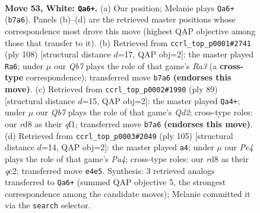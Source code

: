 \documentclass[11pt]{article}
\begin{document}
\clearpage

\begin{figure}[p]\centering
\begin{subfigure}{0.46\textwidth}\centering
\resizebox{\linewidth}{!}{%
\newchessgame
\chessboard[
  setfen={3r4/1Q6/5k2/8/4P3/8/6PP/1K6 w - - 1 53},
  showmover=false,
  pgfstyle=straightmove, color=movearrow, markmove={b7-a6}
]}
\caption{}
\end{subfigure}\hfill
\begin{subfigure}{0.46\textwidth}\centering
\resizebox{\linewidth}{!}{%
\newchessgame
\chessboard[
  setfen={8/6k1/8/6P1/8/R5K1/4P3/7r w - - 1 55},
  showmover=false,
  pgfstyle=straightmove, color=movearrow, markmove={a3-a6}
]}
\caption{}
\end{subfigure}
\\[4pt]
\begin{subfigure}{0.46\textwidth}\centering
\resizebox{\linewidth}{!}{%
\newchessgame
\chessboard[
  setfen={8/3q3k/4p3/4P3/8/P7/2K5/5Q2 b - - 0 45},
  showmover=false,
  pgfstyle=straightmove, color=movearrow, markmove={d7-a4}
]}
\caption{}
\end{subfigure}\hfill
\begin{subfigure}{0.46\textwidth}\centering
\resizebox{\linewidth}{!}{%
\newchessgame
\chessboard[
  setfen={k2q4/5K2/8/p7/8/8/P1Q5/8 b - - 1 53},
  showmover=false,
  pgfstyle=straightmove, color=movearrow, markmove={a5-a4}
]}
\caption{}
\end{subfigure}
\caption{\textbf{Move 53, White: \texttt{Qa6+}.} (a) Our position; Melanie plays \texttt{Qa6+} (\texttt{b7a6}). Panels (b)--(d) are the retrieved master positions whose correspondence most drove this move (highest QAP objective among those that transfer to it). (b) Retrieved from \texttt{ccrl\_top\_p0001\#2741} (ply 108) [structural distance $d$=17, QAP obj=2]: the master played \texttt{Ra6}; under $\mu$ our \emph{Qb7} plays the role of that game's \emph{Ra3} (a \textbf{cross-type} correspondence); transferred move \texttt{b7a6} \textbf{(endorses this move)}. (c) Retrieved from \texttt{ccrl\_top\_p0002\#1990} (ply 89) [structural distance $d$=15, QAP obj=2]: the master played \texttt{Qa4+}; under $\mu$ our \emph{Qb7} plays the role of that game's \emph{Qd2}; cross-type roles: our \emph{r}d8 as their \emph{q}f1; transferred move \texttt{b7a6} \textbf{(endorses this move)}. (d) Retrieved from \texttt{ccrl\_top\_p0003\#2049} (ply 105) [structural distance $d$=14, QAP obj=2]: the master played \texttt{a4}; under $\mu$ our \emph{Pe4} plays the role of that game's \emph{Pa4}; cross-type roles: our \emph{r}d8 as their \emph{q}c2; transferred move \texttt{e4e5}. Synthesis: 3 retrieved analogs transferred to \texttt{Qa6+} (summed QAP objective 5, the strongest correspondence among the candidate moves); Melanie committed it via the \texttt{search} selector.}
\label{fig:thought-m104}
\end{figure}
\end{document}
